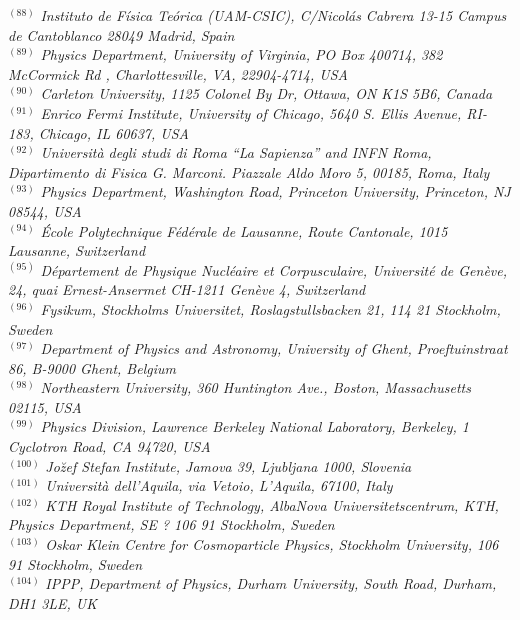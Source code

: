 {\begin{center}
$^{(88)}$ \emph{Instituto de F\'isica Te\'orica (UAM-CSIC), C/Nicol\'as Cabrera 13-15 Campus de Cantoblanco 28049 Madrid, Spain}\\
$^{(89)}$ \emph{Physics Department, University of Virginia,  PO Box 400714, 382 McCormick Rd ,  Charlottesville, VA, 22904-4714, USA}\\
$^{(90)}$ \emph{Carleton University, 1125 Colonel By Dr, Ottawa, ON K1S 5B6, Canada}\\
$^{(91)}$ \emph{Enrico Fermi Institute, University of Chicago, 5640 S. Ellis Avenue, RI-183, Chicago, IL 60637, USA}\\
$^{(92)}$ \emph{Universit\`a degli studi di Roma ``La Sapienza'' and INFN Roma, Dipartimento di Fisica G. Marconi. Piazzale Aldo Moro 5, 00185, Roma, Italy}\\
$^{(93)}$ \emph{Physics Department, Washington Road, Princeton University, Princeton, NJ 08544, USA}\\
$^{(94)}$ \emph{\'Ecole Polytechnique F\'ed\'erale de Lausanne, Route Cantonale, 1015 Lausanne, Switzerland}\\
$^{(95)}$ \emph{D\'epartement de Physique Nucl\'eaire et Corpusculaire, Universit\'e de Gen\`eve, 24, quai Ernest-Ansermet CH-1211 Gen\`eve 4, Switzerland}\\
$^{(96)}$ \emph{Fysikum, Stockholms Universitet, Roslagstullsbacken 21, 114 21 Stockholm, Sweden}\\
$^{(97)}$ \emph{Department of Physics and Astronomy, University of Ghent, Proeftuinstraat 86, B-9000 Ghent, Belgium}\\
$^{(98)}$ \emph{Northeastern University, 360 Huntington Ave., Boston, Massachusetts 02115, USA}\\
$^{(99)}$ \emph{Physics Division, Lawrence Berkeley National Laboratory, Berkeley, 1 Cyclotron Road, CA 94720, USA}\\
$^{(100)}$ \emph{Jo\u zef Stefan Institute, Jamova 39, Ljubljana 1000, Slovenia}\\
$^{(101)}$ \emph{Universit\`a dell'Aquila, via Vetoio, L'Aquila, 67100, Italy}\\
$^{(102)}$ \emph{KTH Royal Institute of Technology, AlbaNova Universitetscentrum, KTH, Physics Department, SE ? 106 91 Stockholm, Sweden}\\
$^{(103)}$ \emph{Oskar Klein Centre for Cosmoparticle Physics, Stockholm University, 106 91 Stockholm, Sweden}\\
$^{(104)}$ \emph{IPPP, Department of Physics, Durham University, South Road, Durham, DH1 3LE, UK}\\

\end{center}}
